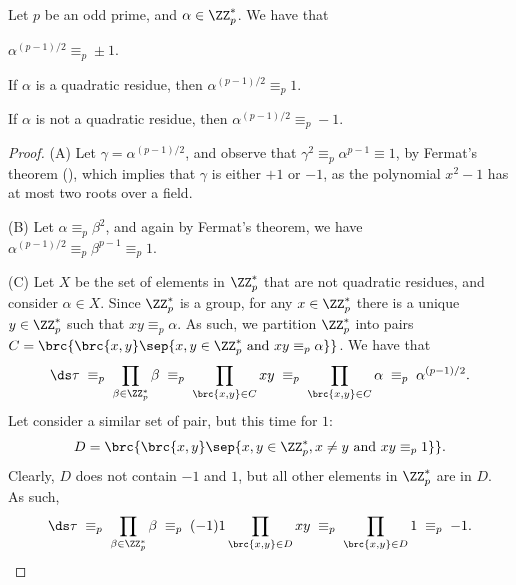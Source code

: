 \begin{theorem}
    Let $p$ be an odd prime, and $\alpha \in \ZZ_p^*$. We have that 
    \begin{compactenumA}
        \item $\alpha^{(p-1)/2} \equiv_p \pm 1$.
        \item If $\alpha$ is a quadratic residue, then
        $\alpha^{(p-1)/2} \equiv_p 1$.
        \item If $\alpha$ is not a quadratic residue, then
        $\alpha^{(p-1)/2} \equiv_p -1$.
    \end{compactenumA}
\end{theorem}
\begin{proof}
    (A) Let $\gamma = \alpha^{(p-1)/2}$, and observe that $\gamma^2
    \equiv_p \alpha^{p-1} \equiv 1$, by Fermat's theorem
    (), which implies that $\gamma$ is either
    $+1$ or $-1$, as the polynomial $x^2 -1$ has at most two roots
    over a field.

    \smallskip

    (B) Let $\alpha \equiv_p \beta^2$, and again by Fermat's theorem,
    we have $\alpha^{(p-1)/2} \equiv_p \beta^{p-1} \equiv_p 1$.

    \smallskip

    (C) Let $X$ be the set of elements in $\ZZ_p^*$ that are not
    quadratic residues, and consider $\alpha \in X$.  Since
    $\ZZ_p^*$ is a group, for any $x \in \ZZ_p^*$ there is a unique $y
    \in \ZZ_p^*$ such that $xy \equiv_p \alpha$.  As such, we
    partition $\ZZ_p^*$ into pairs $C = \brc{ \brc{x, y} \sep{ x, y
          \in \ZZ_p^* \text{ and } xy \equiv_p \alpha}}$. We have that
    \begin{align*}
        \ds \tau%
        \;\equiv_p\;%
        \prod_{\beta \in \ZZ_p^*} \beta%
        \;\equiv_p\;%
        \prod_{\brc{x,y} \in C} x y%
        \;\equiv_p\;%
        \prod_{\brc{x,y} \in C} \alpha%
        \;\equiv_p\;%
        \alpha^{(p-1)/2}.
    \end{align*}
    Let consider a similar set of pair, but this time for $1$: 
    \[
        D = \brc{ \brc{x, y} \sep{ x, y \in \ZZ_p^*, x \neq y \text{
                 and } xy \equiv_p 1}}.
    \]
    Clearly, $D$ does not contain $-1$ and $1$, but all other elements
    in $\ZZ_p^*$ are in $D$. As such,
    \begin{align*}
        \ds \tau%
        \;\equiv_p\;%
        \prod_{\beta \in \ZZ_p^*} \beta%
        \;\equiv_p\;%
        (-1) 1 \prod_{\brc{x,y} \in D} x y%
        \;\equiv_p\;%
        \prod_{\brc{x,y} \in D} 1%
        \;\equiv_p\;%
        -1.
    \end{align*}
\end{proof}


